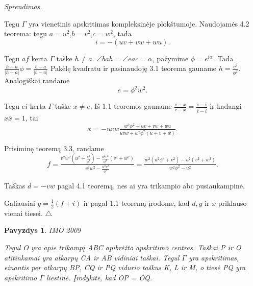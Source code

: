 \documentclass[11pt,a4paper,twoside]{book}
\newenvironment{sprendimas}{\noindent \textit{Sprendimas.}}{\hfill $\triangle$}
\newcounter{foo}[subsection]
\newtheorem{pavnr}[foo]{Pavyzdys}
\theoremstyle{definition} \newtheorem*{api}{Apibrėžimas}
\theoremstyle{remark} \newtheorem*{pastaba}{Pastaba}
\begin{document}
\begin{sprendimas}

Tegu $\Gamma$ yra vienetinis apskritimas kompleksinėje plokštumoje. Naudojamės 4.2 teorema: tegu $a=u^2$,$b=v^2$,$c=w^2$, tada 
\begin{equation*}
i = -(uv+vw+wu).
\end{equation*}

Tegu $af$ kerta $\Gamma$ taške $h\ne a$. $\angle bah =\angle eac =\alpha$, pažymime $\phi=e^{i\alpha}$. Tada $\frac{h-a}{|h-a|}\phi=\frac{b-a}{|b-a|}$ Pakėlę kvadratu ir pasinaudoję 3.1 teorema gauname $h=\frac{v^2}{\phi^2}$. Analogiškai randame 
\begin{equation*}
e=\phi^2w^2.
\end{equation*}

Tegu $ei$ kerta $\Gamma$ taške $x \ne e$. Iš 1.1 teoremos gauname $\frac{e-x}{\overline{e}-\overline{x}}=\frac{e-i}{\overline{e}-\overline{i}}$ ir kadangi $x\overline{x}=1$, tai 
\begin{equation*}
x=-uvw\tfrac{w^2\phi ^2 +uv+vw+wu}{uvw +w^2\phi ^2(u+v+w)}.
\end{equation*}

Prisiminę teoremą 3.3, randame 
\begin{equation*}
f=\tfrac{v^2w^2(u^2 + \frac{v^2}{\phi ^2}) - \frac{u^2v^2}{\phi ^2}(v^2+w^2)}{v^2w^2 - \frac{u^2v^2}{\phi ^2}}=\tfrac{w^2(u^2\phi^2 + v^2) - u^2(v^2+w^2)}{w^2\phi^2 - u^2}.
\end{equation*}

Taškas $d=-vw$ pagal 4.1 teoremą, nes ai yra trikampio abc pusiaukampinė.

Galiausiai $g=\frac{1}{2}(f+i)$ ir pagal 1.1 teoremą įrodome, kad $ d, g$ ir $x$ priklauso vienai tiesei.
\end{sprendimas}
\begin{pavnr}
IMO 2009

Tegul O yra apie trikampį ABC apibrėžto apskritimo
centras. Taškai P ir Q atitinkamai yra atkarpų CA ir AB vidiniai
taškai. Tegul $\Gamma$ yra apskritimas, einantis per atkarpų BP, CQ ir
PQ vidurio taškus K, L ir M, o tiesė PQ yra apskritimo $\Gamma$ liestinė.
Įrodykite, kad OP = OQ.
\end{pavnr}
\end{document}
